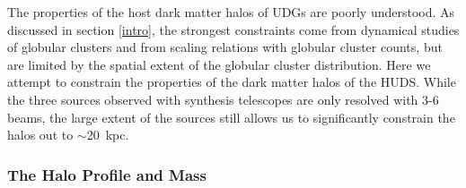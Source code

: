 \documentclass[twocolumn]{aastex6}
\begin{document}
The properties of the host dark matter halos of UDGs are poorly understood. As discussed in section \ref{intro}, the strongest constraints come from dynamical studies of globular clusters and from scaling relations with globular cluster counts, but are limited by the spatial extent of the globular cluster distribution. Here we attempt to constrain the properties of the dark matter halos of the HUDS. While the three sources observed with synthesis telescopes are only resolved with 3-6 beams, the large extent of the sources still allows us to significantly constrain the halos out to $\sim$20~kpc.

\subsubsection{The Halo Profile and Mass}
\label{discussion.dm.mass}
\end{document}
